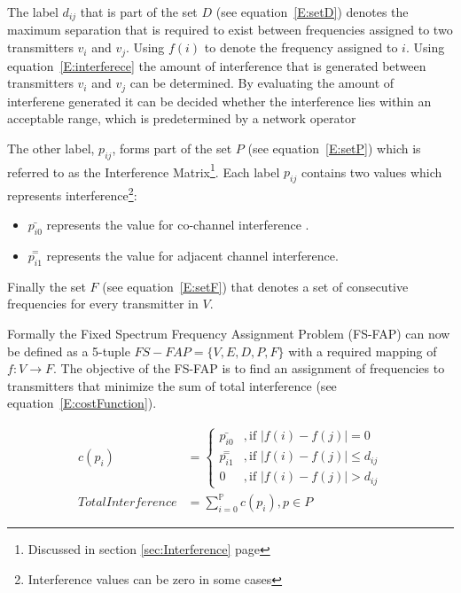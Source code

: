 The label $d_{ij}$ that is part of the set $D$ (see equation~\ref{E:setD}) denotes the maximum separation that is required to exist between frequencies assigned to two transmitters $v_i$ and $v_j$. Using $f(i)$ to denote the frequency assigned to $i$. Using equation~\ref{E:interferece} the amount of interference that is generated between transmitters $v_i$ and $v_j$ can be determined. By evaluating the amount of interferene generated it can be decided whether the interference lies within an acceptable range, which is predetermined by a network operator\cite{FAPOrientationModel,TabuMontemanniSmith}

The other label, $p_{ij}$, forms part of the set $P$ (see equation~\ref{E:setP}) which is referred to as the Interference Matrix\footnote{Discussed in section \ref{sec:Interference} page \pageref{sec:Interference}}. Each label $p_{ij}$ contains two values which represents interference\footnote{Interference values can be zero in some cases}:
\begin{itemize}
\item $\bar{p_{i0}}$ represents the value for co-channel interference \cite{FAPOrientationModel,TabuMontemanniSmith}. 
\item $\overset{=}{p_{i1}}$ represents the value for adjacent channel interference\cite{FAPOrientationModel,TabuMontemanniSmith}.
\end{itemize}

Finally the set $F$ (see equation~\ref{E:setF}) that denotes a set of consecutive frequencies for every transmitter in $V$\cite{FAPOrientationModel,TabuMontemanniSmith}.

Formally the Fixed Spectrum Frequency Assignment Problem (FS-FAP) can now be defined as a 5-tuple \(FS-FAP = \{V,E,D,P,F\}\) with a required mapping of \(f: V \rightarrow F\)\cite{TabuMontemanniSmith}. The objective of the FS-FAP is to find an assignment of frequencies to transmitters that minimize the sum of total interference (see equation~\ref{E:costFunction}).

\begin{align} 
 c(p_i) &= 
 \begin{cases}
	\bar{p_{i0}} &,\text{if $|f(i) - f(j)| = 0$}\\
	\overset{=}{p_{i1}} &, \text{if $|f(i) - f(j)| \leqslant d_{ij}$}\\
	0 &,\text{if $|f(i) - f(j)| > d_{ij}$}
 \end{cases}\\
 \label{E:costFunction}
 Total Interference &= \sum^\mathbb{P}_{i = 0}c(p_i),p \in P 
\end{align}

